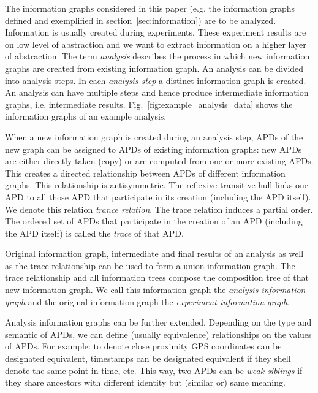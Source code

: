The information graphs considered in this paper (e.g. the information graphs defined and exemplified in section~\ref{sec:information}) are to be analyzed. Information is usually created during experiments. These experiment results are on low level of abstraction and we want to extract information on a higher layer of abstraction. The term \emph{analysis} describes the process in which new information graphs are created from existing information graph. An analysis can be divided into analysis steps. In each \emph{analysis step} a distinct information graph is created. An analysis can have multiple steps and hence produce intermediate information graphs, i.e. intermediate results. Fig.~\ref{fig:example_analysis_data} shows the information graphs of an example analysis.

When a new information graph is created during an analysis step, APDs of the new graph can be assigned to APDs of existing information graphs: new APDs are either directly taken (copy) or are computed from one or more existing APDs. This creates a directed relationship between APDs of different information graphs. This relationship is antisymmetric. The reflexive transitive hull links one APD to all those APD that participate in its creation (including the APD itself). We denote this relation \emph{trance relation}. The trace relation induces a partial order. The ordered set of APDs that participate in the creation of an APD (including the APD itself) is called the \emph{trace} of that APD.

Original information graph, intermediate and final results of an analysis as well as the trace relationship can be used to form a union information graph. The trace relationship and all information trees compose the composition tree of that new information graph. We call this information graph the \emph{analysis information graph} and the original information graph the \emph{experiment information graph}. 

Analysis information graphs can be further extended. Depending on the type and semantic of APDs, we can define (usually equivalence) relationships on the values of APDs. For example: to denote close proximity GPS coordinates can be designated equivalent, timestamps can be designated equivalent if they shell denote the same point in time, etc. This way, two APDs can be \emph{weak siblings} if they share ancestors with different identity but (similar or) same meaning.


